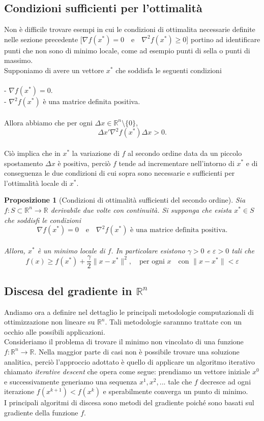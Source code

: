 \documentclass[a4paper, 12pt]{article}
\newtheorem{prop}{Proposizione}
\begin{document}
\subsection{Condizioni sufficienti per l'ottimalità}
Non è difficile trovare esempi in cui le condizioni di ottimalita necessarie definite nelle sezione precedente
[$\nabla f(x^\ast) = 0 \quad \mbox{e} \quad \nabla^2 f(x^\ast) \geq 0$]
portino ad identificare punti che non sono di minimo locale, come ad esempio punti di sella o punti di massimo.\\
Supponiamo di avere un vettore $x^\ast$ che soddisfa le seguenti condizioni\\\\
- $\nabla f(x^\ast) = 0$.\\
- $\nabla^2 f(x^\ast)$ è una matrice definita positiva.\\\\
Allora abbiamo che per ogni $\Delta x \in \mathbb{R}^n \setminus \{0\}$,\\
\[\Delta x' \nabla^2f(x^\ast) \Delta x > 0.\]\\
Ciò implica che in $x^\ast$ la variazione di $f$ al secondo ordine data da un piccolo spostamento $\Delta x$ è positiva, perciò $f$ tende ad incrementare nell'intorno di $x^\ast$ e di conseguenza le due condizioni di cui sopra sono necessarie e sufficienti per l'ottimalità locale di $x^\ast$.
\begin{prop}[Condizioni di ottimalità sufficienti del secondo ordine] Sia $f:S \subset \mathbb{R}^n \to \mathbb{R}$ derivabile due volte con continuità. Si supponga che esista $x^\ast \in S$ che soddisfi le condizioni\\
\[\nabla f(x^\ast) = 0 \quad \mbox{e} \quad \nabla^2 f(x^\ast) \mbox{ è una matrice definita positiva.}\]\\
Allora, $x^\ast$ è un minimo locale di $f$. In particolare esistono $\gamma > 0$ e $\varepsilon > 0$ tali che\\
\[ f(x) \geq f(x^\ast) + \frac{\gamma}{2} \| x - x^\ast \|^2, \quad \mbox{per ogni } x \quad \mbox{con } \| x - x^\ast \| < \varepsilon  \]
\end{prop}
\subsection{Discesa del gradiente in $\mathbb{R}^n$}
Andiamo ora a definire nel dettaglio le principali metodologie computazionali di ottimizzazione non lineare su $\mathbb{R}^n$. Tali metodologie sarannno trattate con un occhio alle possibili applicazioni.\\
Consideriamo il problema di trovare il minimo non vincolato di una funzione $f:\mathbb{R}^n \to \mathbb{R}$. Nella maggior parte di casi non è possibile trovare una soluzione analitica, perciò l'approccio adottato è quello di applicare un algoritmo iterativo chiamato \textit{iterative descent} che opera come segue: prendiamo un vettore iniziale $x^0$ e successivamente generiamo una sequenza $x^1, x^2, ...$ tale che $f$ decresce ad ogni iterazione $f(x^{k+1}) < f(x^k)$ e sperabilmente converga un punto di minimo.\\
I principali algoritmi di discesa sono metodi del gradiente poiché sono basati sul gradiente della funzione $f$.
\end{document}

